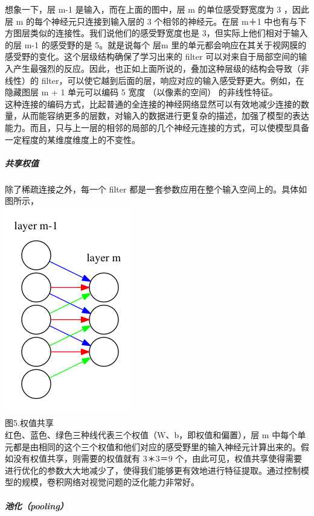 想象一下，层 m-1 是输入，而在上面的图中，层 m 的单位感受野宽度为 3
，因此层 m 的每个神经元只连接到输入层的 3 个相邻的神经元。在层 m＋1
中也有与下方图层类似的连接性。我们说他们的感受野宽度也是
3，但实际上他们相对于输入的层 m-1 的感受野的是 5。就是说每个 层m
里的单元都会响应在其关于视网膜的感受野的变化。这个层级结构确保了学习出来的
filter
可以对来自于局部空间的输入产生最强烈的反应。因此，也正如上面所说的，叠加这种层级的结构会导致（非线性）的
filter，可以使它越到后面的层，响应对应的输入感受野更大。例如，在隐藏图层
m + 1 单元可以编码 5 宽度 （以像素的空间）
的非线性特征。\\这种连接的编码方式，比起普通的全连接的神经网络显然可以有效地减少连接的数量，从而能容纳更多的层数，对输入的数据进行更复杂的描述，加强了模型的表达能力。而且，只与上一层的相邻的局部的几个神经元连接的方式，可以使模型具备一定程度的某维度维度上的不变性。

\subparagraph{共享权值}\label{ux5171ux4eabux6743ux503c}

除了稀疏连接之外，每一个 filter
都是一套参数应用在整个输入空间上的。具体如图所示，\\\includegraphics{picture/shared-weights.png}\\图5.权值共享\\红色、蓝色、绿色三种线代表三个权值（W、b，即权值和偏置），层
m
中每个单元都是由相同的这个三个权值和他们对应的感受野里的输入神经元计算出来的。假如没有权值共享，则需要的权值就有
\(3 ＊ 3 ＝ 9\)
个，由此可见，权值共享使得需要进行优化的参数大大地减少了，使得我们能够更有效地进行特征提取。通过控制模型的规模，卷积网络对视觉问题的泛化能力非常好。

\subparagraph{池化（pooling）}\label{ux6c60ux5316pooling}


